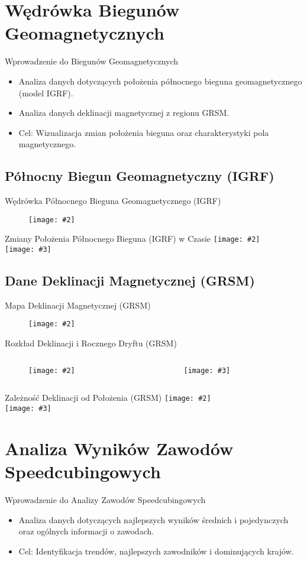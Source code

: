 \documentclass[10pt]{beamer} %
\newcommand{\fullslideimage}[3][width=\textwidth,height=0.75\textheight,keepaspectratio]{
  \begin{frame}{#3} %
    \begin{figure}
      \centering
      \texttt{[image: \#2]} %
    \end{figure}
  \end{frame}
}
\newcommand{\twoslideimages}[4][width=0.48\textwidth,height=0.65\textheight,keepaspectratio]{%
  \begin{frame}{#4}
    \begin{columns}[T] %
      \begin{column}{0.5\textwidth}
        \begin{figure}
          \centering
          \texttt{[image: \#2]}
        \end{figure}
      \end{column}
      \begin{column}{0.5\textwidth}
        \begin{figure}
          \centering
          \texttt{[image: \#3]}
        \end{figure}
      \end{column}
    \end{columns}
  \end{frame}
}
\newcommand{\twoimagesstacked}[4][width=0.8\textwidth,height=0.35\textheight,keepaspectratio]{%
  \begin{frame}{#4}
    \centering
    \texttt{[image: \#2]}\\[1ex] %
    \texttt{[image: \#3]}        %
  \end{frame}
}
\begin{document}
\section{Wędrówka Biegunów Geomagnetycznych}

\begin{frame}{Wprowadzenie do Biegunów Geomagnetycznych}
  \begin{itemize}
    \item Analiza danych dotyczących położenia północnego bieguna geomagnetycznego (model IGRF).
    \item Analiza danych deklinacji magnetycznej z regionu GRSM\@.
    \item Cel: Wizualizacja zmian położenia bieguna oraz charakterystyki pola magnetycznego.
  \end{itemize}
\end{frame}

\subsection{Północny Biegun Geomagnetyczny (IGRF)}
\fullslideimage{igrf\_north\_pole\_wander\_map\_labels.png}{Wędrówka Północnego Bieguna Geomagnetycznego (IGRF)}
\twoimagesstacked{igrf\_north\_pole\_latitude\_vs\_time.png}{igrf\_north\_pole\_longitude\_vs\_time.png}{Zmiany Położenia Północnego Bieguna (IGRF) w Czasie}

\subsection{Dane Deklinacji Magnetycznej (GRSM)}
\fullslideimage{grsm\_declination\_map.png}{Mapa Deklinacji Magnetycznej (GRSM)}
\twoslideimages{grsm\_declination\_histogram.png}{grsm\_annual\_drift\_histogram.png}{Rozkład Deklinacji i Rocznego Dryftu (GRSM)}
\twoimagesstacked{grsm\_declination\_vs\_latitude.png}{grsm\_declination\_vs\_longitude.png}{Zależność Deklinacji od Położenia (GRSM)}


\section{Analiza Wyników Zawodów Speedcubingowych}

\begin{frame}{Wprowadzenie do Analizy Zawodów Speedcubingowych}
    \begin{itemize}
        \item Analiza danych dotyczących najlepszych wyników średnich i pojedynczych oraz ogólnych informacji o zawodach.
        \item Cel: Identyfikacja trendów, najlepszych zawodników i dominujących krajów.
    \end{itemize}
\end{frame}
\end{document}
